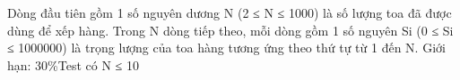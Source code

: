 Dòng đầu tiên gồm 1 số nguyên dương N (2 ≤ N ≤ 1000) là số lượng toa đã được dùng để xếp hàng.  Trong N dòng tiếp theo, mỗi dòng gồm 1 số nguyên Si (0 ≤ Si ≤ 1000000) là trọng lượng của toa hàng tương ứng theo thứ tự từ 1 đến N.    Giới hạn: 30\%Test có N ≤ 10  

\